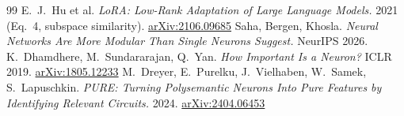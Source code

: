 \documentclass[11pt,a4paper]{article}
\begin{document}
\begin{thebibliography}{99}
 E.~J.~Hu et al. \emph{LoRA: Low-Rank Adaptation of Large Language Models.} 2021 (Eq.~4, subspace similarity). \href{https://arxiv.org/abs/2106.09685}{arXiv:2106.09685}
 Saha, Bergen, Khosla. \emph{Neural Networks Are More Modular Than Single Neurons Suggest.} NeurIPS 2026.
 K.~Dhamdhere, M.~Sundararajan, Q.~Yan. \emph{How Important Is a Neuron?} ICLR 2019. \href{https://arxiv.org/abs/1805.12233}{arXiv:1805.12233}
 M.~Dreyer, E.~Purelku, J.~Vielhaben, W.~Samek, S.~Lapuschkin. \emph{PURE: Turning Polysemantic Neurons Into Pure Features by Identifying Relevant Circuits.} 2024. \href{https://arxiv.org/abs/2404.06453}{arXiv:2404.06453}
\end{thebibliography}
\end{document}
